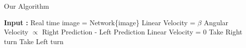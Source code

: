 \documentclass{article}
\begin{document}
\begin{algorithm}
\caption{Our Algorithm}\label{test_fly}
\begin{algorithmic}[1]
    \State \textbf{Input : } Real time image
     = Network\{image\}
        \State Linear Velocity = $\beta$
        \State Angular Velocity $\propto$ Right Prediction - Left Prediction
    \Else
        \State Linear Velocity = 0
                \State Take Right turn
        \EndWhile
        \Else
            \State Take Left turn
        \EndWhile
        \EndIf 
    \EndIf
\EndWhile

\end{algorithmic}
\end{algorithm}
\end{document}
